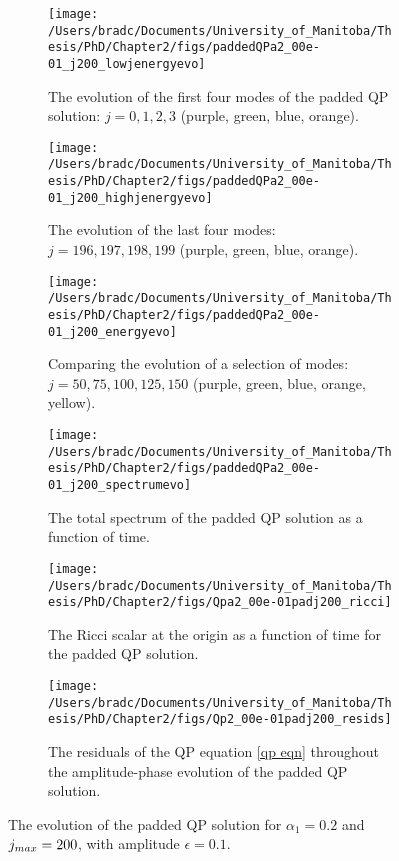\documentclass[../PhD.tex]{subfiles}
\begin{document}
\begin{figure}[h]
	\centering
	\begin{subfigure}[t]{0.45\textwidth}
		\texttt{[image: /Users/bradc/Documents/University\_of\_Manitoba/Thesis/PhD/Chapter2/figs/paddedQPa2\_00e-01\_j200\_lowjenergyevo]}
		\caption{The evolution of the first four modes of the padded QP solution: $j=0,1,2,3$ (purple, green, blue, orange).}
	\end{subfigure}
	\;
	\begin{subfigure}[t]{0.45\textwidth}
		\texttt{[image: /Users/bradc/Documents/University\_of\_Manitoba/Thesis/PhD/Chapter2/figs/paddedQPa2\_00e-01\_j200\_highjenergyevo]}
		\caption{The evolution of the last four modes: $j = 196, 197, 198, 199$ (purple, green, blue, orange).}
	\end{subfigure}
	\;
	\begin{subfigure}[t]{0.45\textwidth}
		\texttt{[image: /Users/bradc/Documents/University\_of\_Manitoba/Thesis/PhD/Chapter2/figs/paddedQPa2\_00e-01\_j200\_energyevo]}
		\caption{Comparing the evolution of a selection of modes: $j= 50, 75, 100, 125, 150$ (purple, green, blue, orange, yellow).}
	\end{subfigure}
	\;
	\begin{subfigure}[t]{0.45\textwidth}
		\texttt{[image: /Users/bradc/Documents/University\_of\_Manitoba/Thesis/PhD/Chapter2/figs/paddedQPa2\_00e-01\_j200\_spectrumevo]}
		\caption{The total spectrum of the padded QP solution as a function of time.}
		\label{fig: paddedqp_fullspecevo}
	\end{subfigure}
	\;
	\begin{subfigure}[t]{0.45\textwidth}
		\texttt{[image: /Users/bradc/Documents/University\_of\_Manitoba/Thesis/PhD/Chapter2/figs/Qpa2\_00e-01padj200\_ricci]}
		\caption{The Ricci scalar at the origin as a function of time for the padded QP solution.}
	\end{subfigure}
	\;
	\begin{subfigure}[t]{0.45\textwidth}
		\texttt{[image: /Users/bradc/Documents/University\_of\_Manitoba/Thesis/PhD/Chapter2/figs/Qp2\_00e-01padj200\_resids]}
		\caption{The residuals of the QP equation \eqref{qp eqn} throughout the amplitude-phase evolution of the padded QP solution.}
		\label{fig: Qp2_00e-01padj200_resids}
	\end{subfigure}
	\caption{The evolution of the padded QP solution for $\alpha_1 =0.2$ and $j_{max} = 200$, with amplitude $\epsilon=0.1$.}
	\label{fig:paddedqpevo}
\end{figure}
\end{document}
